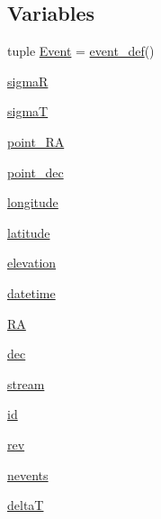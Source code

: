\subsection*{Variables}
\begin{DoxyCompactItemize}
\item 
tuple \hyperlink{namespaceamonpy_1_1dbase_1_1db__classes_addf9b6ab76d93bfdebf988a2895ff34f}{Event} = \hyperlink{namespaceamonpy_1_1dbase_1_1db__classes_a6d7088f9593d82867532ef736e26f2f7}{event\-\_\-def}()
\item 
\hyperlink{namespaceamonpy_1_1dbase_1_1db__classes_ae05fd637497daebdcb0cca7044926cd3}{sigma\-R}
\item 
\hyperlink{namespaceamonpy_1_1dbase_1_1db__classes_ad0767f5c0c80ad02abbf61aab485b444}{sigma\-T}
\item 
\hyperlink{namespaceamonpy_1_1dbase_1_1db__classes_abffb2aca4c4fae167e7d385c22f528b3}{point\-\_\-\-R\-A}
\item 
\hyperlink{namespaceamonpy_1_1dbase_1_1db__classes_a6c4dfc506de762cbb50a8cdebc263e8e}{point\-\_\-dec}
\item 
\hyperlink{namespaceamonpy_1_1dbase_1_1db__classes_a15a38b01ffc48ef3ca06d3378afaedcd}{longitude}
\item 
\hyperlink{namespaceamonpy_1_1dbase_1_1db__classes_a5b23674f16dd7136e87b30c0f7cb2194}{latitude}
\item 
\hyperlink{namespaceamonpy_1_1dbase_1_1db__classes_a5a1632bf843d0f0ae5900eb04aaad787}{elevation}
\item 
\hyperlink{namespaceamonpy_1_1dbase_1_1db__classes_ae78b921654586e117c92fec127c99be1}{datetime}
\item 
\hyperlink{namespaceamonpy_1_1dbase_1_1db__classes_ace7891a3d914ddc3aada697fc748e7b7}{R\-A}
\item 
\hyperlink{namespaceamonpy_1_1dbase_1_1db__classes_ae45e4ba2ed3d299db4f4499e229453e4}{dec}
\item 
\hyperlink{namespaceamonpy_1_1dbase_1_1db__classes_a0e199a7f868e23d8c9fbc7b24bdb077b}{stream}
\item 
\hyperlink{namespaceamonpy_1_1dbase_1_1db__classes_ab5b1b0adcc922d552d83dd685c0ec93b}{id}
\item 
\hyperlink{namespaceamonpy_1_1dbase_1_1db__classes_a670afebce6bd27727a769e9b8146a5ca}{rev}
\item 
\hyperlink{namespaceamonpy_1_1dbase_1_1db__classes_aabd0c63e0a065a5da54e18f169409cd1}{nevents}
\item 
\hyperlink{namespaceamonpy_1_1dbase_1_1db__classes_a4da539a081d13412d12017ea4d2ef1e1}{delta\-T}

\end{DoxyCompactItemize}
